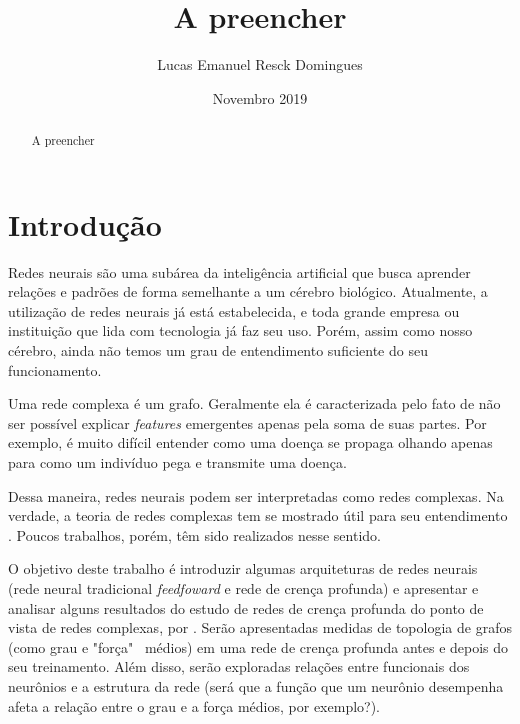 \documentclass{article}
\title{A preencher}
\author{Lucas Emanuel Resck Domingues}
\date{Novembro 2019}
\begin{document}
    \maketitle

    \begin{abstract}
        A preencher
    \end{abstract}
    
    \newpage

    \tableofcontents

    \newpage

    \section{Introdução}

        Redes neurais são uma subárea da inteligência artificial que busca aprender relações e padrões de forma semelhante a um cérebro biológico.
        Atualmente, a utilização de redes neurais já está estabelecida, e toda grande empresa ou instituição que lida com tecnologia já faz seu uso.
        Porém, assim como nosso cérebro, ainda não temos um grau de entendimento suficiente do seu funcionamento.

        Uma rede complexa é um grafo.
        Geralmente ela é caracterizada pelo fato de não ser possível explicar \textit{features} emergentes apenas pela soma de suas partes.
        Por exemplo, é muito difícil entender como uma doença se propaga olhando apenas para como um indivíduo pega e transmite uma doença.
        
        Dessa maneira, redes neurais podem ser interpretadas como redes complexas.
        Na verdade, a teoria de redes complexas tem se mostrado útil para seu entendimento \cite{galhardo2006redes}.
        Poucos trabalhos, porém, têm sido realizados nesse sentido.

        O objetivo deste trabalho é introduzir algumas arquiteturas de redes neurais (rede neural tradicional \textit{feedfoward} e rede de crença profunda)
        e apresentar e analisar alguns resultados do estudo de redes de crença profunda do ponto de vista de redes complexas, por \cite{testolin2018deep}.
        Serão apresentadas medidas de topologia de grafos (como grau e "força" \ médios) em uma rede de crença profunda antes e depois do seu treinamento.
        Além disso, serão exploradas relações entre funcionais dos neurônios e a estrutura da rede (será que a função que um neurônio desempenha afeta a relação entre o grau e a força médios, por exemplo?).
\end{document}
